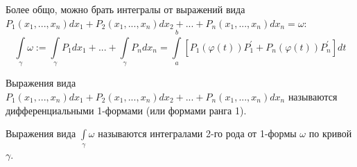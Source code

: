 \begin{remark}
    Более общо, можно брать интегралы от выражений вида $P_1(x_1, ..., x_n)dx_1 + P_2(x_1, ..., x_n)dx_2 + ... + P_n(x_1, ..., x_n)dx_n = \omega$:
    \[
        \int\limits_{\gamma} \omega :=
        \int\limits_{\gamma} P_1dx_1 + ... + \int\limits_{\gamma} P_ndx_n =
        \int\limits_{a}^{b} \left[P_1(\varphi(t)) P_1^{'} + P_n(\varphi(t)) P_n^{'}\right]dt
    \]
\end{remark}

\begin{definition}
    Выражения вида $P_1(x_1, ..., x_n)dx_1 + P_2(x_1, ..., x_n)dx_2 + ... + P_n(x_1, ..., x_n)dx_n$ называются дифференциальными 1-формами
    (или формами ранга 1).
\end{definition}

\begin{definition}
    Выражения вида $\int\limits_{\gamma} \omega$ называются интегралами 2-го рода от 1-формы $\omega$ по кривой $\gamma$.
\end{definition}
